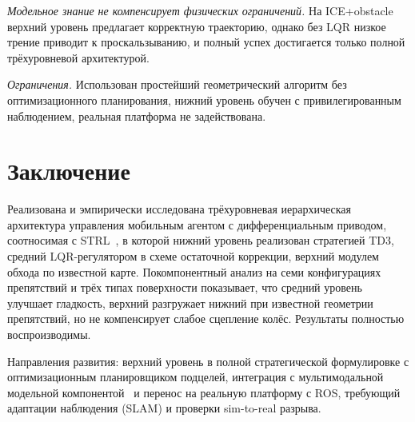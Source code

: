 \documentclass[11pt]{article}
\begin{document}
\textit{Модельное знание не компенсирует физических ограничений.} На ICE+obstacle верхний уровень предлагает корректную траекторию, однако без LQR низкое трение приводит к проскальзыванию, и полный успех достигается только полной трёхуровневой архитектурой.

\textit{Ограничения.} Использован простейший геометрический алгоритм без оптимизационного планирования, нижний уровень обучен с привилегированным наблюдением, реальная платформа не задействована.

\section{Заключение}
\label{sec:conclusion}

Реализована и эмпирически исследована трёхуровневая иерархическая архитектура управления мобильным агентом с дифференциальным приводом, соотносимая с STRL~\cite{kiselev2020dissertation,kiselev2020}, в которой нижний уровень реализован стратегией TD3, средний LQR-регулятором в схеме остаточной коррекции, верхний модулем обхода по известной карте. Покомпонентный анализ на семи конфигурациях препятствий и трёх типах поверхности показывает, что средний уровень улучшает гладкость, верхний разгружает нижний при известной геометрии препятствий, но не компенсирует слабое сцепление колёс. Результаты полностью воспроизводимы.

Направления развития: верхний уровень в полной стратегической формулировке с оптимизационным планировщиком подцелей, интеграция с мультимодальной модельной компонентой~\cite{veitsenfeld2024} и перенос на реальную платформу с ROS, требующий адаптации наблюдения (SLAM) и проверки sim-to-real разрыва.
\end{document}
